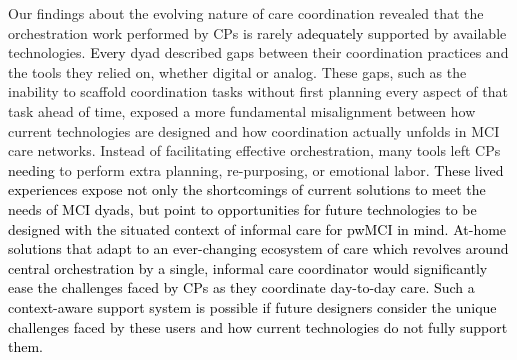 \documentclass[acmsmall]{acmart}
\begin{document}
Our findings about the evolving nature of care coordination revealed that the orchestration work performed by CPs is rarely \textcolor{black}{adequately} supported by available technologies. \textcolor{black}{Every} dyad described gaps between their coordination practices and the tools they relied on, whether digital or analog. These gaps, such as the inability to scaffold coordination tasks without first planning every aspect of that task ahead of time, exposed a more fundamental misalignment between how current technologies are designed and how coordination actually unfolds in MCI care networks. Instead of facilitating effective orchestration, many tools left CPs \textcolor{black}{needing} to perform extra planning, re-purposing, or emotional labor. \textcolor{black}{These lived experiences expose not only the shortcomings of current solutions to meet the needs of MCI dyads, but point to opportunities for future technologies to be designed with the situated context of informal care for pwMCI in mind. At-home solutions that adapt to an ever-changing ecosystem of care which revolves around central orchestration by a single, informal care coordinator would significantly ease the challenges faced by CPs as they coordinate day-to-day care. Such a context-aware support system is possible if future designers consider the unique challenges faced by these users and how current technolog\textcolor{black}{ies do not} fully support them.}
\end{document}
